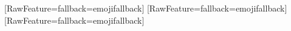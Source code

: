 \usepackage{fontspec}
\usepackage{luacode} %


\setmainfont{Source Sans Pro}[RawFeature={fallback=emojifallback}]
\setsansfont{Source Sans Pro}[RawFeature={fallback=emojifallback}]
\setmonofont{Source Sans Pro}[RawFeature={fallback=emojifallback}]

\usepackage{emo}

\usepackage{fancyhdr}%
\pagestyle{fancy}%
\fancyhf{}%
\fancyfoot[R]{\thepage}
\renewcommand{\headrulewidth}{0.4pt}%
\renewcommand{\footrulewidth}{0.4pt}%
